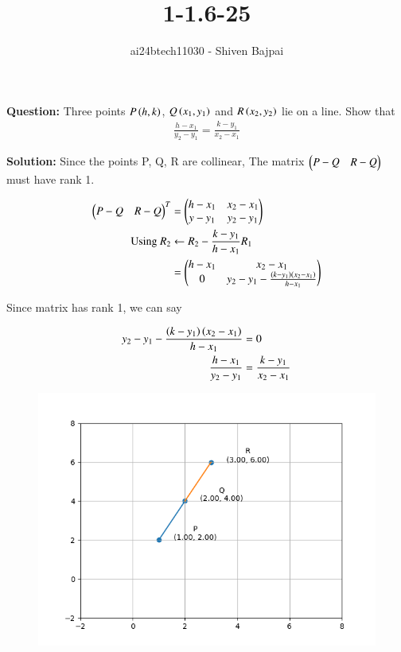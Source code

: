 \documentclass[journal]{IEEEtran}
\begin{document}
\onecolumn

\vspace{3cm}

\renewcommand{\thefigure}{\theenumi}
\renewcommand{\thetable}{\theenumi}

\title{1-1.6-25}
\author{ai24btech11030 - Shiven Bajpai}
\maketitle

\renewcommand{\thefigure}{\theenumi}
\renewcommand{\thetable}{\theenumi}

\textbf{Question: } Three points $P\left(h, k\right)$, $Q\left(x_1, y_1\right)$ and $R\left(x_2, y_2\right)$ lie on a line. Show that \begin{align*}\frac{h-x_1}{y_2-y_1} = \frac{k - y_1}{x_2 - x_1}\end{align*}

    \textbf{Solution: }  Since the points P, Q, R are collinear, The matrix $\begin{pmatrix}P-Q & R-Q\end{pmatrix}$ must have rank 1.

\begin{align*}
    \begin{pmatrix}P-Q & R-Q\end{pmatrix}^T &= \begin{pmatrix}h-x_1 & x_2 - x_1 \\ y-y_1 & y_2-y_1\end{pmatrix}\\
    \text{Using  } R_2 &\leftarrow R_2 - \frac{k-y_1}{h-x_1}R_1\\
    &= \begin{pmatrix}h-x_1 & x_2 - x_1 \\ 0 & y_2-y_1 -\frac{\left(k-y_1\right)\left({x_2 - x_1}\right)}{h-x_1}\end{pmatrix}
\end{align*}

Since matrix has rank 1, we can say

\begin{align*}
    y_2-y_1 -\frac{\left(k-y_1\right)\left({x_2 - x_1}\right)}{h-x_1} &= 0\\
    \frac{h-x_1}{y_2-y_1} &= \frac{k - y_1}{x_2 - x_1}
\end{align*}

\newpage

\begin{figure}[H]
	\centering
	\includegraphics[width=0.75\columnwidth]{Figures/Figure.png}
	\label{fig}
\end{figure}
\end{document}
